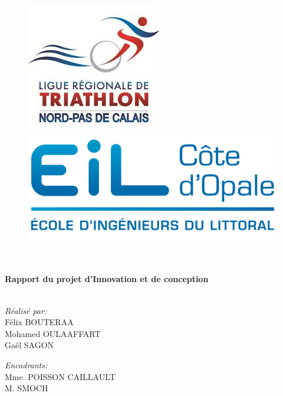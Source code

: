 \begin{titlepage}
  \begin{sffamily}
  \begin{center}
\begin{figure}
\includegraphics[scale=0.8]{img/logo_png.png} \hfill
\includegraphics[scale=0.7]{img/eilco.png} 
\end{figure}
    \textsc{\Large }\\[1.5cm]
    \HRule \\[0.4cm]
    { \huge \bfseries Rapport du projet d'Innovation et de conception\\[0.4cm] }
	\textsc{\Large}
    \HRule \\[10cm]
    

    \begin{minipage}{0.4\textwidth}
      \begin{flushleft} \large
\emph{Réalisé par:} \\
Félix \textsc{BOUTERAA} \\
Mohamed \textsc{OULAAFFART} \\
Gaël \textsc{SAGON}
   
        \emph{}
      \end{flushleft}
    \end{minipage}
    \begin{minipage}{0.4\textwidth}
      \begin{flushright} \large
        \emph{Encadrants:}\\
Mme. \textsc{POISSON CAILLAULT}\\
M. \textsc{SMOCH}

        \emph{}
      \end{flushright}
    \end{minipage}

    \vfill
  \end{center}
  \end{sffamily}
\end{titlepage}
